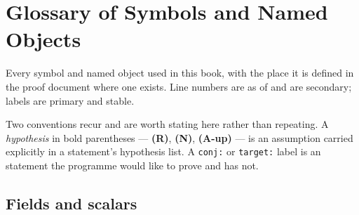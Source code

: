 \chapter{Glossary of Symbols and Named Objects}
\label{ch:glossary}

\begin{record}
Every symbol and named object used in this book, with the place it is defined
in the proof document where one exists. Line numbers are as of  and are
secondary; labels are primary and stable.

\smallskip
Two conventions recur and are worth stating here rather than repeating. A
\emph{hypothesis} in bold parentheses --- \textbf{(R)}, \textbf{(N)},
\textbf{(A-up)} --- is an assumption carried explicitly in a statement's
hypothesis list. A \texttt{conj:} or \texttt{target:} label is an
\OPEN{} statement the programme would like to prove and has not.
\end{record}

\section{Fields and scalars}
\label{sec:a3-fields}

